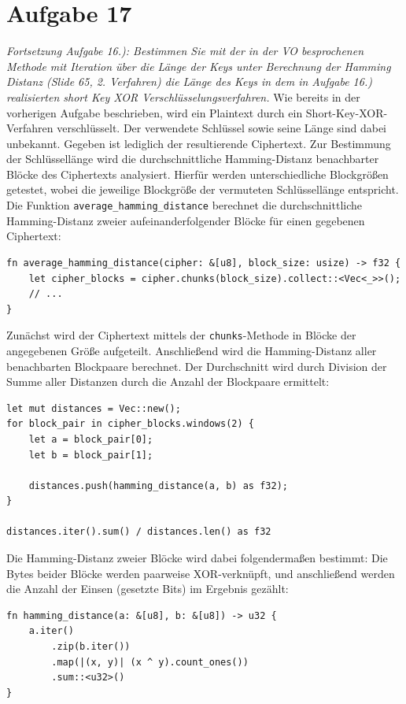 \section{Aufgabe 17}
\textit{Fortsetzung Aufgabe 16.): Bestimmen Sie mit der in der VO besprochenen Methode
mit Iteration über die Länge der Keys unter Berechnung der Hamming Distanz (Slide
65, 2. Verfahren) die Länge des Keys in dem in Aufgabe 16.) realisierten short Key
XOR Verschlüsselungsverfahren.}\vspace*{1em}\newline
Wie bereits in der vorherigen Aufgabe beschrieben, wird ein Plaintext durch ein Short-Key-XOR-Verfahren verschlüsselt. Der verwendete Schlüssel sowie seine Länge sind dabei unbekannt. Gegeben ist lediglich der resultierende Ciphertext.
Zur Bestimmung der Schlüssellänge wird die durchschnittliche Hamming-Distanz benachbarter Blöcke des Ciphertexts analysiert. Hierfür werden unterschiedliche Blockgrößen getestet, wobei die jeweilige Blockgröße der vermuteten Schlüssellänge entspricht.
Die Funktion \verb|average_hamming_distance| berechnet die durchschnittliche Hamming-Distanz zweier aufeinanderfolgender Blöcke für einen gegebenen Ciphertext:
\begin{verbatim}
fn average_hamming_distance(cipher: &[u8], block_size: usize) -> f32 {
    let cipher_blocks = cipher.chunks(block_size).collect::<Vec<_>>();
    // ...
}
\end{verbatim}
Zunächst wird der Ciphertext mittels der \verb|chunks|-Methode in Blöcke der angegebenen Größe aufgeteilt. Anschließend wird die Hamming-Distanz aller benachbarten Blockpaare berechnet. Der Durchschnitt wird durch Division der Summe aller Distanzen durch die Anzahl der Blockpaare ermittelt:
\begin{verbatim}
let mut distances = Vec::new();
for block_pair in cipher_blocks.windows(2) {
    let a = block_pair[0];
    let b = block_pair[1];

    distances.push(hamming_distance(a, b) as f32);
}

distances.iter().sum() / distances.len() as f32
\end{verbatim}
Die Hamming-Distanz zweier Blöcke wird dabei folgendermaßen bestimmt: Die Bytes beider Blöcke werden paarweise XOR-verknüpft, und anschließend werden die Anzahl der Einsen (gesetzte Bits) im Ergebnis gezählt:
\begin{verbatim}
fn hamming_distance(a: &[u8], b: &[u8]) -> u32 {
    a.iter()
        .zip(b.iter())
        .map(|(x, y)| (x ^ y).count_ones())
        .sum::<u32>()
}
\end{verbatim}
